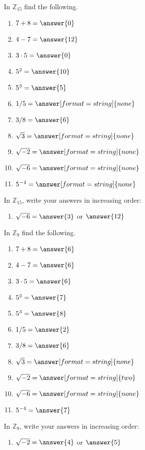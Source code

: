 \documentclass[space,nooutcomes,handout]{ximera}
\begin{document}
\begin{problem}
In $\mathbb{Z}_{15}$ find the following. 
\begin{enumerate}
\item $7 + 8 =\answer{0}$
\item $4 - 7 =\answer{12}$
\item $3\cdot 5 =\answer{0}$
\item $5^2 =\answer{10}$
\item $5^3 =\answer{5}$ 
\item $1/5 =\answer[format=string]{none}$
\item $3/8 =\answer{6}$ 
\item $\sqrt{3} =\answer[format=string]{none}$
\item $\sqrt{-2} =\answer[format=string]{none}$  
\item $\sqrt{-6} =\answer[format=string]{none}$  
\item  $5^{-4}  =\answer[format=string]{none}$ 
\end{enumerate}
\begin{problem}
In $\mathbb{Z}_{15}$, write your answers in increasing order: 
\begin{enumerate}
\item $\sqrt{-6} =\answer{3}$ or $\answer{12}$  %
\end{enumerate}
\end{problem}
\end{problem}

\begin{problem}
In $\mathbb{Z}_{9}$ find the following. 
\begin{enumerate}
\item $7 + 8 =\answer{6}$
\item $4 - 7 =\answer{6}$
\item $3\cdot 5 =\answer{6}$
\item $5^2 =\answer{7}$
\item $5^3 =\answer{8}$ 
\item $1/5 =\answer{2}$
\item $3/8 =\answer{6}$ 
\item $\sqrt{3} =\answer[format=string]{none}$ 
\item $\sqrt{-2} =\answer[format=string]{two}$  %
\item $\sqrt{-6} =\answer[format=string]{none}$ 
\item  $5^{-4}  =\answer{7}$ 
\end{enumerate}
\begin{problem}
In $\mathbb{Z}_{9}$, write your answers in increasing order: 
\begin{enumerate}
\item $\sqrt{-2} =\answer{4}$ or $\answer{5}$  %
\end{enumerate}
\end{problem}
\end{problem}
\end{document}
